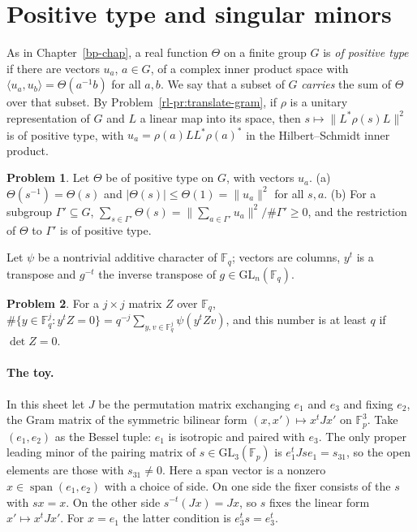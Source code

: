 \documentclass[reqno]{amsart}
\newcounter{chap}
\theoremstyle{definition}
\newtheorem{problem}{Problem}[section]
\theoremstyle{plain}
\theoremstyle{remark}
\newcommand{\F}{\mathbb{F}}
\newcommand{\GL}{\mathrm{GL}}
\begin{document}
\section{Positive type and singular minors}\label{sec:positive}

As in Chapter~\ref{bp-chap}, a real function \(\Theta\) on a finite group \(G\) is \emph{of positive type} if there are vectors \(u_a\), \(a\in G\), of a complex inner product space with \(\langle u_a,u_b\rangle=\Theta(a^{-1}b)\) for all \(a,b\).  We say that a subset of \(G\) \emph{carries} the sum of \(\Theta\) over that subset.  By Problem~\ref{rl-pr:translate-gram}, if \(\rho\) is a unitary representation of \(G\) and \(L\) a linear map into its space, then \(s\mapsto\lVert L^*\rho(s)L\rVert^2\) is of positive type, with \(u_a=\rho(a)LL^*\rho(a)^*\) in the Hilbert--Schmidt inner product.

\begin{problem}\label{pr:positive}
Let \(\Theta\) be of positive type on \(G\), with vectors \(u_a\).  (a) \(\Theta(s^{-1})=\Theta(s)\) and \(\lvert\Theta(s)\rvert\le\Theta(1)=\lVert u_a\rVert^2\) for all \(s,a\).  (b) For a subgroup \(\Gamma'\subseteq G\), \(\sum_{s\in\Gamma'}\Theta(s)=\lVert\sum_{a\in\Gamma'}u_a\rVert^2/\#\Gamma'\ge0\), and the restriction of \(\Theta\) to \(\Gamma'\) is of positive type.
\end{problem}

Let \(\psi\) be a nontrivial additive character of \(\F_q\); vectors are columns, \(y^t\) is a transpose and \(g^{-t}\) the inverse transpose of \(g\in\GL_n(\F_q)\).

\begin{problem}\label{pr:kernel}
For a \(j\times j\) matrix \(Z\) over \(\F_q\), \(\#\{y\in\F_q^j:y^tZ=0\}=q^{-j}\sum_{y,v\in\F_q^j}\psi(y^tZv)\), and this number is at least \(q\) if \(\det Z=0\).
\end{problem}

\paragraph{The toy.}  In this sheet let \(J\) be the permutation matrix exchanging \(e_1\) and \(e_3\) and fixing \(e_2\), the Gram matrix of the symmetric bilinear form \((x,x')\mapsto x^tJx'\) on \(\F_p^3\).  Take \((e_1,e_2)\) as the Bessel tuple: \(e_1\) is isotropic and paired with \(e_3\).  The only proper leading minor of the pairing matrix of \(s\in\GL_3(\F_p)\) is \(e_1^tJse_1=s_{31}\), so the open elements are those with \(s_{31}\ne0\).  Here a span vector is a nonzero \(x\in\operatorname{span}(e_1,e_2)\) with a choice of side.  On one side the fixer consists of the \(s\) with \(sx=x\).  On the other side \(s^{-t}(Jx)=Jx\), so \(s\) fixes the linear form \(x'\mapsto x^tJx'\).  For \(x=e_1\) the latter condition is \(e_3^ts=e_3^t\).
\end{document}

